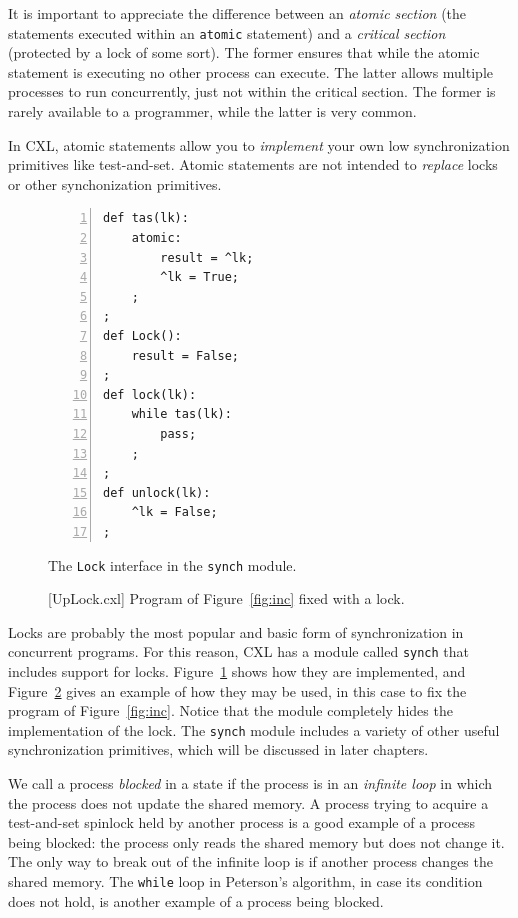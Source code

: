 \documentclass{report}
\newenvironment{code}{
\tcolorbox
}{
\endtcolorbox
}
\begin{document}
It is important to appreciate the difference between an
\emph{atomic section} (the statements executed within an
\texttt{atomic} statement) and a \emph{critical section}
(protected by a lock of some sort).
The former ensures that while the
atomic statement is executing no other process can execute.
The latter allows multiple processes to run concurrently,
just not within the critical section.
The former is rarely available to a programmer, while the latter
is very common.

In CXL, atomic statements allow you to \emph{implement} your own
low synchronization primitives like test-and-set.  Atomic statements
are not intended to \emph{replace} locks or other synchonization primitives.

\begin{figure}
\begin{code}
\begin{Verbatim}[xleftmargin=5mm,numbers=left]
def tas(lk):
    atomic:
        result = ^lk;
        ^lk = True;
    ;
;
def Lock():
    result = False;
;
def lock(lk):
    while tas(lk):
        pass;
    ;
;
def unlock(lk):
    ^lk = False;
;
\end{Verbatim}
\end{code}
\caption{The \texttt{Lock} interface in the \texttt{synch} module.}
\label{fig:spinlocks}
\end{figure}

\begin{figure}
\begin{code}
\end{code}
\caption{[UpLock.cxl] Program of Figure~\ref{fig:inc} fixed with a lock.}
\label{fig:incfixed}
\end{figure}

Locks are probably the most popular and basic form of synchronization
in concurrent programs.  For this reason, CXL has a module called
\texttt{synch} that includes support for locks.
Figure~\ref{fig:spinlocks} shows how they are implemented, and
Figure~\ref{fig:incfixed} gives an example of how they may be used,
in this case to fix the program of Figure~\ref{fig:inc}.
Notice that the module completely hides the implementation of the
lock.
The \texttt{synch} module includes a variety of other useful
synchronization primitives, which will be discussed in later
chapters.

We call a process \emph{blocked}
in a state if the process is in
an \emph{infinite loop} in which the process does not update the
shared memory.
A process trying to
acquire a test-and-set spinlock held by another process is a good example
of a process being blocked: the process only reads the shared memory
but does not change it.
The only way to break out of the infinite loop is if another process
changes the shared memory.
The \texttt{while} loop in Peterson's algorithm, in case its condition
does not hold, is another example of a process being blocked.
\end{document}
